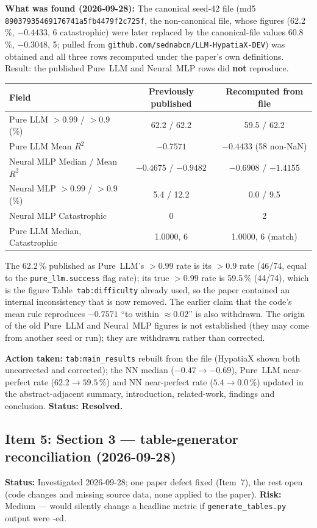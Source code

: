 \documentclass[11pt]{article}
\begin{document}
\textbf{What was found (2026-09-28):} The canonical seed-42 file
(md5 \texttt{89037935469176741a5fb4479f2c725f}, the non-canonical file, whose figures (62.2\,\%, $-0.4433$, 6 catastrophic) were later replaced by the canonical-file values 60.8\,\%, $-0.3048$, 5; pulled from
\texttt{github.com/sednabcn/LLM-HypatiaX-DEV}) was obtained and all
three rows recomputed under the paper's own definitions. Result: the
published Pure~LLM and Neural~MLP rows did \textbf{not} reproduce.
\begin{center}
\begin{tabular}{lcc}
\toprule
Field & Previously published & Recomputed from file \\
\midrule
Pure LLM $>0.99$ / $>0.9$ (\%) & 62.2 / 62.2 & 59.5 / 62.2 \\
Pure LLM Mean $R^2$ & $-0.7571$ & $-0.4433$ (58 non-NaN) \\
Neural MLP Median / Mean $R^2$ & $-0.4675$ / $-0.9482$ & $-0.6908$ / $-1.4155$ \\
Neural MLP $>0.99$ / $>0.9$ (\%) & 5.4 / 12.2 & 0.0 / 9.5 \\
Neural MLP Catastrophic & 0 & 2 \\
Pure LLM Median, Catastrophic & 1.0000, 6 & 1.0000, 6 (match) \\
\bottomrule
\end{tabular}
\end{center}
The 62.2\,\% published as Pure~LLM's $>0.99$ rate is its $>0.9$ rate (46/74,
equal to the \texttt{pure\_llm.success} flag rate); its true $>0.99$ rate is
59.5\,\% (44/74), which is the figure Table~\texttt{tab:difficulty} already
used, so the paper contained an internal inconsistency that is now removed.
The earlier claim that the code's mean rule reproduces $-0.7571$ ``to
within $\approx0.02$'' is also withdrawn. The origin of the old Pure~LLM and
Neural~MLP figures is not established (they may come from another seed or
run); they are withdrawn rather than corrected.

\textbf{Action taken:} \texttt{tab:main\_results} rebuilt from the file
(HypatiaX shown both uncorrected and corrected); the NN median ($-0.47
\to -0.69$), Pure~LLM near-perfect rate ($62.2 \to 59.5\,\%$) and NN
near-perfect rate ($5.4 \to 0.0\,\%$) updated in the abstract-adjacent
summary, introduction, related-work, findings and conclusion. \textbf{Status: Resolved.}

\subsection*{Item 5: Section 3 --- table-generator reconciliation (2026-09-28)}
\textbf{Status:} Investigated 2026-09-28; one paper defect fixed (Item~7), the rest
open (code changes and missing source data, none applied to the paper).
\textbf{Risk:} Medium --- would silently change a headline metric if
\texttt{generate\_tables.py} output were \verb||-ed.
\end{document}
